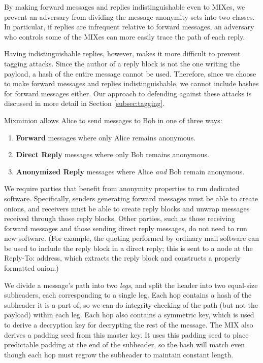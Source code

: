 \documentclass{llncs}
\begin{document}
By making forward messages and replies indistinguishable even to MIXes,
we prevent an
adversary from dividing the message anonymity sets into two classes. In
particular, if replies are infrequent relative to forward messages,
an adversary who controls some of the MIXes can more easily trace the
path of each reply.

Having indistinguishable replies, however, makes it more difficult to
prevent tagging attacks.  Since the author of a reply block is not the
one writing the payload, a hash of the entire message cannot be used.
Therefore, since we choose to make forward messages and replies
indistinguishable, we cannot include hashes for forward messages either.
Our approach to defending against these attacks is discussed in more
detail in Section \ref{subsec:tagging}.

Mixminion allows Alice to send messages to Bob in one of three ways:

\begin{enumerate}
\item \textbf{Forward} messages where only Alice remains anonymous.
\item \textbf{Direct Reply} messages where only Bob remains anonymous.
\item \textbf{Anonymized Reply} messages where Alice \emph{and} Bob
   remain anonymous.
\end{enumerate}

We require parties that benefit from anonymity properties to run dedicated
software.  Specifically, senders generating forward messages must be able
to create onions, and receivers must be able to create reply blocks
and unwrap messages received through those reply blocks. Other parties,
such as those receiving forward messages and those sending direct reply
messages, do not need to run new software. (For example, the quoting
performed by ordinary mail software can be used to include the reply
block in a direct reply; this is sent to a node at the Reply-To:
address, which extracts the reply block and constructs a properly
formatted onion.)

We divide a message's path into two \emph{legs}, and split the header
into two equal-size subheaders, each corresponding to a single leg.
Each hop contains a hash of the subheader it is a part of, so we can do
integrity-checking of the path (but not the payload) within each leg.
Each hop also contains a symmetric key, which is used to derive a
decryption key for decrypting the rest of the message. The MIX also
derives a padding seed from this master key. It uses this padding seed
to place
predictable padding at the end of the subheader, so the hash will
match even though each hop must regrow the subheader to maintain
constant length.
\end{document}
